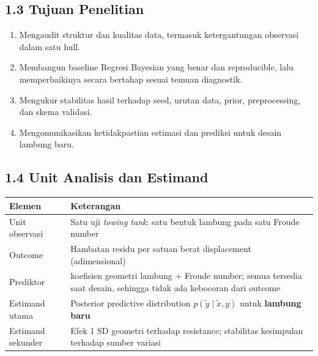 \documentclass[
]{article}
\newcounter{none} %
\providecommand{\tightlist}{%
  \setlength{\itemsep}{0pt}\setlength{\parskip}{0pt}}
\begin{document}
\subsection{1.3 Tujuan Penelitian}\label{tujuan-penelitian}

\begin{enumerate}
\def\labelenumi{\arabic{enumi}.}
\tightlist
\item
  Mengaudit struktur dan kualitas data, termasuk ketergantungan
  observasi dalam satu hull.
\item
  Membangun baseline Regresi Bayesian yang benar dan reproducible, lalu
  memperbaikinya secara bertahap sesuai temuan diagnostik.
\item
  Mengukur stabilitas hasil terhadap seed, urutan data, prior,
  preprocessing, dan skema validasi.
\item
  Mengomunikasikan ketidakpastian estimasi dan prediksi untuk desain
  lambung baru.
\end{enumerate}

\subsection{1.4 Unit Analisis dan
Estimand}\label{unit-analisis-dan-estimand}

{\def\LTcaptype{none} %
\begin{longtable}[]{@{}
  >{\raggedright\arraybackslash}p{}
  >{\raggedright\arraybackslash}p{}@{}}
\toprule\noalign{}
\begin{minipage}[b]{\linewidth}\raggedright
Elemen
\end{minipage} & \begin{minipage}[b]{\linewidth}\raggedright
Keterangan
\end{minipage} \\
\midrule\noalign{}
\endhead
\bottomrule\noalign{}
\endlastfoot
Unit observasi & Satu uji \emph{towing tank}: satu bentuk lambung pada
satu Froude number \\
Outcome & Hambatan residu per satuan berat displacement
(adimensional) \\
Prediktor & 5 koefisien geometri lambung + Froude number; semua tersedia
saat desain, sehingga tidak ada kebocoran dari outcome \\
Estimand utama & Posterior predictive distribution
\(p(\tilde y \mid \tilde x, y)\) untuk \textbf{lambung baru} \\
Estimand sekunder & Efek 1 SD geometri terhadap resistance; stabilitas
kesimpulan terhadap sumber variasi \\
\end{longtable}
}
\end{document}
